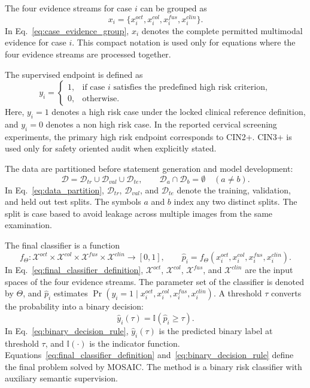 The four evidence streams for case $i$ can be grouped as
\begin{equation}
x_i=\{x_i^{oct},x_i^{col},x_i^{fus},x_i^{clin}\}.
\label{eq:case_evidence_group}
\end{equation}
In Eq.~\eqref{eq:case_evidence_group}, $x_i$ denotes the complete permitted multimodal evidence for case $i$. This compact notation is used only for equations where the four evidence streams are processed together.

The supervised endpoint is defined as
\begin{equation}
y_i=
\begin{cases}
1, & \text{if case } i \text{ satisfies the predefined high risk criterion},\\
0, & \text{otherwise}.
\end{cases}
\label{eq:binary_endpoint}
\end{equation}
Here, $y_i=1$ denotes a high risk case under the locked clinical reference definition, and $y_i=0$ denotes a non high risk case. In the reported cervical screening experiments, the primary high risk endpoint corresponds to CIN2+. CIN3+ is used only for safety oriented audit when explicitly stated.

The data are partitioned before statement generation and model development:
\begin{equation}
\mathcal{D}=\mathcal{D}_{tr}\cup\mathcal{D}_{val}\cup\mathcal{D}_{te},
\qquad
\mathcal{D}_{a}\cap\mathcal{D}_{b}=\emptyset\quad(a\neq b).
\label{eq:data_partition}
\end{equation}
In Eq.~\eqref{eq:data_partition}, $\mathcal{D}_{tr}$, $\mathcal{D}_{val}$, and $\mathcal{D}_{te}$ denote the training, validation, and held out test splits. The symbols $a$ and $b$ index any two distinct splits. The split is case based to avoid leakage across multiple images from the same examination.

The final classifier is a function
\begin{equation}
f_{\Theta}:\mathcal{X}^{oct}\times\mathcal{X}^{col}\times\mathcal{X}^{fus}\times\mathcal{X}^{clin}\rightarrow[0,1],
\qquad
\hat{p}_i=f_{\Theta}(x_i^{oct},x_i^{col},x_i^{fus},x_i^{clin}).
\label{eq:final_classifier_definition}
\end{equation}
In Eq.~\eqref{eq:final_classifier_definition}, $\mathcal{X}^{oct}$, $\mathcal{X}^{col}$, $\mathcal{X}^{fus}$, and $\mathcal{X}^{clin}$ are the input spaces of the four evidence streams. The parameter set of the classifier is denoted by $\Theta$, and $\hat{p}_i$ estimates $\Pr(y_i=1\mid x_i^{oct},x_i^{col},x_i^{fus},x_i^{clin})$. A threshold $\tau$ converts the probability into a binary decision:
\begin{equation}
\hat{y}_i(\tau)=\mathbb{I}(\hat{p}_i\geq\tau).
\label{eq:binary_decision_rule}
\end{equation}
In Eq.~\eqref{eq:binary_decision_rule}, $\hat{y}_i(\tau)$ is the predicted binary label at threshold $\tau$, and $\mathbb{I}(\cdot)$ is the indicator function. Equations~\eqref{eq:final_classifier_definition} and~\eqref{eq:binary_decision_rule} define the final problem solved by MOSAIC. The method is a binary risk classifier with auxiliary semantic supervision.

